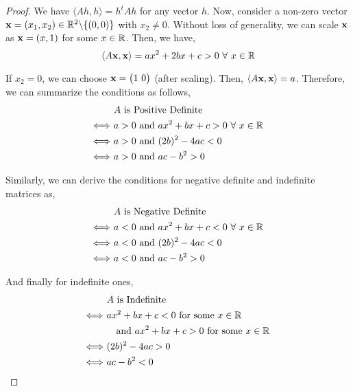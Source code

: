\documentclass[../Analysis-3.tex]{subfiles}
\begin{document}
\begin{proof}
  We have $\langle Ah, h \rangle = h^tAh$ for any vector $h$. Now, consider a non-zero vector ${\bf x} = (x_1, x_2) \in \mathbb{R}^2 \backslash \{(0,0)\}$ with $x_2 \neq 0$. Without loss of generality, we can scale ${\bf x}$ as ${\bf x} = (x,1)$ for some $x \in \mathbb{R}$. Then, we have,
  \[ \inp{A\bf{x}}{\bf{x}} = ax^2 + 2bx + c > 0 \ \forall\ x \in \R \]

  If $x_2 = 0$, we can choose ${\bf x} = \begin{pmatrix}
      1 \
      0
    \end{pmatrix}$ (after scaling). Then, $\langle A{\bf x}, {\bf x} \rangle = a$. Therefore, we can summarize the conditions as follows,
  \begin{align*}
                        & \ A \text{ is Positive Definite}                         \\
    \Longleftrightarrow & \ a > 0 \text{ and } ax^2 + bx+c > 0 \ \forall\ x \in \mathbb{R} \\
    \Longleftrightarrow & \ a > 0 \text{ and } (2b)^2 - 4ac < 0                    \\
    \Longleftrightarrow & \ a > 0 \text{ and } ac - b^2 > 0
  \end{align*}

  Similarly, we can derive the conditions for negative definite and indefinite matrices as,
  \begin{align*}
                        & \ A \text{ is Negative Definite}                         \\
    \Longleftrightarrow & \ a < 0 \text{ and } ax^2 + bx+c < 0 \ \forall\ x \in \mathbb{R} \\
    \Longleftrightarrow & \ a < 0 \text{ and } (2b)^2 - 4ac < 0                    \\
    \Longleftrightarrow & \ a < 0 \text{ and } ac - b^2 > 0
  \end{align*}

  And finally for indefinite ones,
  \begin{align*}
                        & \ A \text{ is Indefinite}                                      \\
    \Longleftrightarrow & \ ax^2 + bx+c < 0 \ \text{for some } x \in \R                  \\
                        & \quad \text{ and } ax^2 + bx+c > 0 \ \text{for some } x \in \R \\
    \Longleftrightarrow & \ (2b)^2 - 4ac > 0                                             \\
    \Longleftrightarrow & \ ac - b^2 < 0
  \end{align*}
\end{proof}
\end{document}
